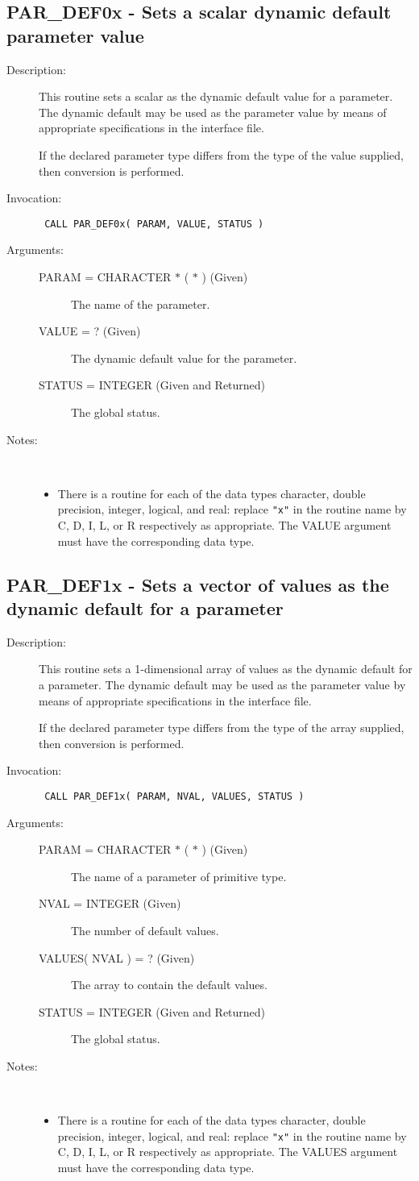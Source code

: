 \documentclass[twoside,11pt]{article}
\newcommand{\xlabel}[1]{}
\newlength{\sstbannerlength}
\newlength{\sstcaptionlength}
\newlength{\sstexampleslength}
\newlength{\sstexampleswidth}
\newcommand{\sstroutine}[3]{
   \goodbreak
   \rule{\textwidth}{0.5mm}
   \vspace{-7ex}
   \newline
   \settowidth{\sstbannerlength}{{\Large {\bf #1}}}
   \setlength{\sstcaptionlength}{\textwidth}
   \setlength{\sstexampleslength}{\textwidth}
   \addtolength{\sstbannerlength}{0.5em}
   \addtolength{\sstcaptionlength}{-2.0\sstbannerlength}
   \addtolength{\sstcaptionlength}{-5.0pt}
   \settowidth{\sstexampleswidth}{{\bf Examples:}}
   \addtolength{\sstexampleslength}{-\sstexampleswidth}
   \parbox[t]{\sstbannerlength}{\flushleft{\Large {\bf #1}}}
   \parbox[t]{\sstcaptionlength}{\center{\Large #2}}
   \parbox[t]{\sstbannerlength}{\flushright{\Large {\bf #1}}}
   \begin{description}
      #3
   \end{description}
}
\newcommand{\sstdescription}[1]{\item[Description:] #1}
\newcommand{\sstinvocation}[1]{\item[Invocation:]\hspace{0.4em}{\tt #1}}
\newcommand{\sstarguments}[1]{
   \item[Arguments:] \mbox{} \\
   \vspace{-3.5ex}
   \begin{description}
      #1
   \end{description}
}
\newcommand{\sstsubsection}[1]{ \item[{#1}] \mbox{} \\}
\newcommand{\sstnotes}[1]{\item[Notes:] \mbox{} \\[1.3ex] #1}
\newcommand{\sstitemlist}[1]{
  \mbox{} \\
  \vspace{-7ex}
  \begin{itemize}
     #1
  \end{itemize}
}
\newcommand{\sstitem}{\item}
\newcommand{\ssttt}{\tt}
\renewcommand{\sstroutine}[3]{
      \subsection{\xlabel{12}#1\xlabel{#1}-\label{#1}#2}
      \begin{description}
         #3
      \end{description}
   }
\renewcommand{\sstdescription}[1]{\item[Description:]
      \begin{description}
         #1
      \end{description}
   }
\renewcommand{\sstinvocation}[1]{\item[Invocation:]
      \begin{description}
         {\ssttt #1}
      \end{description}
   }
\renewcommand{\sstarguments}[1]{
      \item[Arguments:]
      \begin{description}
         #1
      \end{description}
   }
\renewcommand{\sstsubsection}[1]{\item[{#1}]}
\renewcommand{\sstnotes}[1]{\item[Notes:]
      \begin{description}
         #1
      \end{description}
   }
\newcommand{\sstitemlist}[1]{
      \begin{itemize}
         #1
      \end{itemize}
   }
\begin{document}
\sstroutine{
   PAR\_DEF0x
}{
   Sets a scalar dynamic default parameter value
}{
   \sstdescription{
      This routine sets a scalar as the dynamic default value for a
      parameter. The dynamic default may be used as the parameter value
      by means of appropriate specifications in the interface file.

      If the declared parameter type differs from the type of the
      value supplied, then conversion is performed.
   }
   \sstinvocation{
      CALL PAR\_DEF0x( PARAM, VALUE, STATUS )
   }
   \sstarguments{
      \sstsubsection{
         PARAM = CHARACTER $*$ ( $*$ ) (Given)
      }{
         The name of the parameter.
      }
      \sstsubsection{
         VALUE = ? (Given)
      }{
         The dynamic default value for the parameter.
      }
      \sstsubsection{
         STATUS = INTEGER (Given and Returned)
      }{
         The global status.
      }
   }
   \sstnotes{
      \sstitemlist{
         \sstitem There is a routine for each of the data types character,
         double precision, integer, logical, and real: replace {\tt "x"} in the
         routine name by C, D, I, L, or R respectively as appropriate.  The
         VALUE argument must have the corresponding data type.
      }
   }
}

\sstroutine{
   PAR\_DEF1x
}{
   Sets a vector of values as the dynamic default for a parameter
}{
   \sstdescription{
      This routine sets a 1-dimensional array of values as the dynamic
      default for a parameter. The dynamic default may be used as the
      parameter value by means of appropriate specifications in the
      interface file.

      If the declared parameter type differs from the type of the
      array supplied, then conversion is performed.
   }
   \sstinvocation{
      CALL PAR\_DEF1x( PARAM, NVAL, VALUES, STATUS )
   }
   \sstarguments{
      \sstsubsection{
         PARAM = CHARACTER $*$ ( $*$ ) (Given)
      }{
         The name of a parameter of primitive type.
      }
      \sstsubsection{
         NVAL = INTEGER (Given)
      }{
         The number of default values.
      }
      \sstsubsection{
         VALUES( NVAL ) = ? (Given)
      }{
         The array to contain the default values.
      }
      \sstsubsection{
         STATUS = INTEGER (Given and Returned)
      }{
         The global status.
      }
   }
   \sstnotes{
      \sstitemlist{

         \sstitem
         There is a routine for each of the data types character,
         double precision, integer, logical, and real: replace {\tt "x"} in the
         routine name by C, D, I, L, or R respectively as appropriate.  The
         VALUES argument must have the corresponding data type.
      }
   }
}
\end{document}
